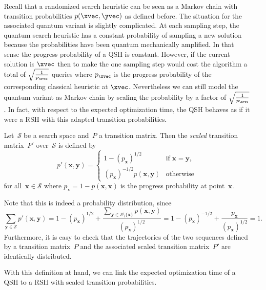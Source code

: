 Recall that a randomized search heuristic can be seen as a Markov
chain with transition probabilities $p(\xvec,\yvec)$ as defined
before. The situation for the associated quantum variant is slightly
complicated. At each sampling step, the quantum search heuristic has a
constant probability of sampling a new solution because the
probabilities have been quantum mechanically amplified. In that sense
the progress probability of a QSH is constant. However, if the
current solution is $\xvec$ then to make the one sampling step would
cost the algorithm a total of $\sqrt{\frac{1}{p_{\xvec}}}$ queries
where $p_{\xvec}$ is the progress probability of the corresponding
classical heuristic at $\xvec$. Nevertheless we can still model the
quantum variant as Markov chain by scaling the probability by a factor
of $\sqrt{\frac{1}{p_{\xvec}}}$. In fact, with respect to the expected
optimization time, the QSH behaves as if it were a RSH with this
adapted transition probabilities.



\begin{definition}
Let~$\mathcal{S}$ be a search space and~$P$ a transition matrix. Then the \emph{scaled} transition matrix~$P'$ over~$\mathcal{S}$ is defined by
\begin{equation*}
p'(\mathbf{x},\mathbf{y})=\begin{cases}
1-(p_{\mathbf{x}})^{1/2} & \text{if }\mathbf{x}=\mathbf{y},\\
(p_{\mathbf{x}})^{-1/2}p(\mathbf{x},\mathbf{y}) & \text{otherwise}
\end{cases}
\end{equation*}
for all~$\mathbf{x}\in\mathcal{S}$ where $p_{\mathbf{x}}=1-p(\mathbf{x},\mathbf{x})$ is the progress probability at point~$\mathbf{x}$.
\end{definition}

Note that this is indeed a probability distribution, since
\[
\sum_{\mathbf{y}\in\mathcal{S}}p'(\mathbf{x},\mathbf{y})=1-(p_{\mathbf{x}})^{1/2}+\frac{\sum_{\mathbf{y}\in\mathcal{S}\setminus\{\mathbf{x}\}}p(\mathbf{x},\mathbf{y})}{(p_{\mathbf{x}})^{1/2}}=1-(p_{\mathbf{x}})^{-1/2}+\frac{p_{\mathbf{x}}}{(p_{\mathbf{x}})^{1/2}}=1.
\]
Furthermore, it is easy to check that the trajectories of the two sequences defined by a transition matrix~$P$ and the associated scaled transition matrix~$P'$ are identically distributed.%



With this definition at hand, we can link the expected optimization time of a QSH to a RSH with scaled transition probabilities.

